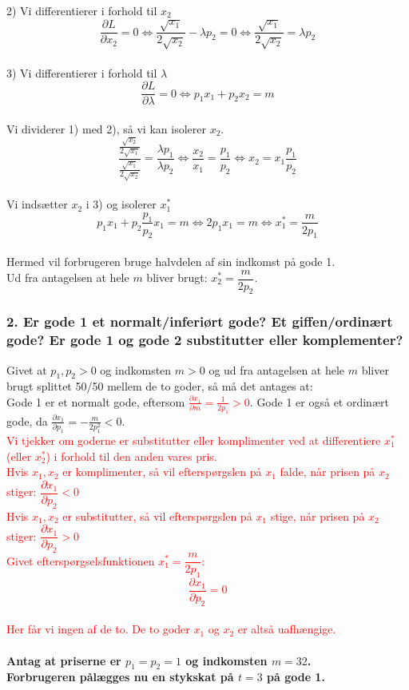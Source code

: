 \documentclass[a4paper, 12pt]{article}
\begin{document}
2) Vi differentierer i forhold til $x_{2}$
$$\dfrac{\partial L}{\partial x_{2}} = 0 \Leftrightarrow \frac{\sqrt{x_{1}}}{2\sqrt{x_{2}}} - \lambda p_{2} = 0 \Leftrightarrow \frac{\sqrt{x_{1}}}{2\sqrt{x_{2}}} = \lambda p_{2}$$
\\
3) Vi differentierer i forhold til $\lambda$
$$\dfrac{\partial L}{\partial \lambda} = 0 \Leftrightarrow p_{1}x_{1} + p_{2}x_{2} = m$$
\\
Vi dividerer 1) med 2), så vi kan isolerer $x_{2}$.
$$\dfrac{\frac{\sqrt{x_{2}}}{2\sqrt{x_{1}}}}{\frac{\sqrt{x_{1}}}{2\sqrt{x_{2}}}} = \dfrac{\lambda p_{1}}{\lambda p_{2}} \Leftrightarrow \dfrac{x_{2}}{x_{1}} = \dfrac{p_{1}}{p_{2}} \Leftrightarrow x_{2} = x_{1} \dfrac{p_{1}}{p_{2}}$$
\\
Vi indsætter $x_{2}$ i 3) og isolerer $x_{1}^{*}$
$$ p_{1}x_{1} + p_{2} \dfrac{p_{1}}{p_{2}}x_{1} = m  \Leftrightarrow 2p_{1}x_{1} = m \Leftrightarrow x_{1}^{*} = \dfrac{m}{2p_{1}}$$\\
Hermed vil forbrugeren bruge halvdelen af sin indkomst på gode 1.\\
Ud fra antagelsen at hele $m$ bliver brugt:  $ x_{2}^{*} = \dfrac{m}{2p_{2}}$.

\subsubsection*{2. Er gode 1 et normalt/inferiørt gode? Et giffen/ordinært gode? Er gode 1 og gode 2 substitutter eller komplementer?}
Givet at $p_{1},p_{2} > 0$ og indkomsten $m > 0$ og ud fra antagelsen at hele $m$ bliver brugt splittet 50/50 mellem de to goder, så må det antages at:
\\
Gode 1 er et normalt gode, eftersom \textcolor{red}{ $\frac{\partial x_{1}}{\partial m} = \frac{1}{2p_{1}} > 0$}. Gode 1 er også et ordinært gode, da $\frac{\partial x_{1}}{\partial p_{1}} = - \frac{m}{2p_{1}^{2}} < 0$.
\\
\textcolor{red}{Vi tjekker om goderne er substitutter eller komplimenter ved at differentiere $x_{1}^{*}$ (eller $x_{2}^{*}$) i forhold til den anden vares pris.}
\\
\textcolor{red}{Hvis $x_{1},x_{2}$ er komplimenter, så vil efterspørgslen på $x_{1}$ falde, når prisen på $x_{2}$ stiger: $ \dfrac{\partial x_{1}}{\partial p_{2}} < 0$ }
\\
\textcolor{red}{ Hvis $x_{1},x_{2}$ er substitutter, så vil efterspørgslen på $x_{1}$ stige, når prisen på $x_{2}$ stiger: $ \dfrac{\partial x_{1}}{\partial p_{2}} > 0$ }
\\
\textcolor{red}{Givet efterspørgselsfunktionen $x_{1}^{*} = \dfrac{m}{2p_{1}} $:}
\textcolor{red}{$$\dfrac{\partial x_{1}}{\partial p_{2}} = 0$$}
\\
\textcolor{red}{Her får vi ingen af de to. De to goder $x_{1}$ og $x_{2}$ er altså uafhængige.}
\\\\
\textbf{Antag at priserne er $p_{1}=p_{2}=1$ og indkomsten $m=32$.}\\
\textbf{Forbrugeren pålægges nu en stykskat på $t=3$ på gode 1.}
\end{document}
